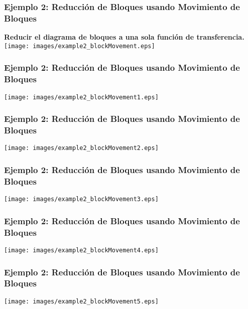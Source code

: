 \documentclass[aspectratio=169,handout]{beamer}
\theoremstyle{definition}
\theoremstyle{plain}
\theoremstyle{remark}
\begin{document}
\begin{frame}[<+->]\frametitle{Ejemplo 2: Reducción de Bloques usando Movimiento de Bloques}
\textbf{Reducir el diagrama de bloques a una sola función de transferencia.}\\
\centering
\vspace*{5mm}
\texttt{[image: images/example2\_blockMovement.eps]}	
\end{frame}

\begin{frame}[<+->]\frametitle{Ejemplo 2: Reducción de Bloques usando Movimiento de Bloques}
\centering
\vspace*{5mm}
\texttt{[image: images/example2\_blockMovement1.eps]}	
\end{frame}

\begin{frame}[<+->]\frametitle{Ejemplo 2: Reducción de Bloques usando Movimiento de Bloques}
\centering
\vspace*{5mm}
\texttt{[image: images/example2\_blockMovement2.eps]}	
\end{frame}

\begin{frame}[<+->]\frametitle{Ejemplo 2: Reducción de Bloques usando Movimiento de Bloques}
\centering
\vspace*{5mm}
\texttt{[image: images/example2\_blockMovement3.eps]}	
\end{frame}

\begin{frame}[<+->]\frametitle{Ejemplo 2: Reducción de Bloques usando Movimiento de Bloques}
\centering
\vspace*{5mm}
\texttt{[image: images/example2\_blockMovement4.eps]}	
\end{frame}

\begin{frame}[<+->]\frametitle{Ejemplo 2: Reducción de Bloques usando Movimiento de Bloques}
\centering
\vspace*{5mm}
\texttt{[image: images/example2\_blockMovement5.eps]}	
\end{frame}
\end{document}
